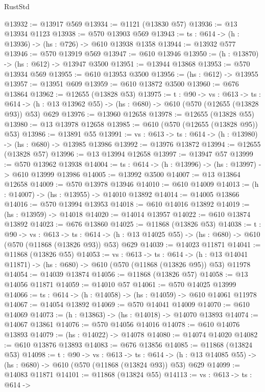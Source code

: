 \begin{lexlean}{RustStd}
\begin{coremodule}
@13932 := @13917 @569
@13934 := @1121 (@13830 @57)
@13936 := @13 @13934 @1123
@13938 := @570 @13903 @569
@13943 := {ts : @614} -> (h : @13936) -> (hs : @726) -> @610 @13938 @1358
@13944 := @13932 @577
@13946 := @570 @13919 @569
@13947 := @610 @13946
@13950 := (h : @13870) -> (hs : @612) -> @13947 @3500
@13951 := @13944 @13868
@13953 := @570 @13934 @569
@13955 := @610 @13953 @3500
@13956 := (hs : @612) -> @13955
@13957 := @13951 @609
@13959 := @610 @13872 @3500
@13960 := @676 @13864
@13962 := @12655 (@13828 @53)
@13975 := {t : @90} ->
  {vs : @613} ->
  {ts : @614} -> (h : @13 @13962 @55) -> (hs : @680) -> @610 (@570 (@12655 (@13828 @93)) @53) @629
@13976 := @13960 @12658
@13978 := @12655 (@13828 @55)
@13980 := @13 @13978 @12658
@13985 := @610 (@570 (@12655 (@13828 @95)) @53)
@13986 := @13891 @55
@13991 := {vs : @613} -> {ts : @614} -> (h : @13980) -> (hs : @680) -> @13985 @13986
@13992 := @13976 @13872
@13994 := @12655 (@13828 @57)
@13996 := @13 @13994 @12658
@13997 := @13947 @57
@13999 := @570 @13962 @13938
@14004 := {ts : @614} -> (h : @13996) -> (hs : @13997) -> @610 @13999 @13986
@14005 := @13992 @3500
@14007 := @13 @13864 @12658
@14009 := @570 @13978 @13946
@14010 := @610 @14009
@14013 := (h : @14007) -> (hs : @13955) -> @14010 @13892
@14014 := @14005 @13866
@14016 := @570 @13994 @13953
@14018 := @610 @14016 @13892
@14019 := (hs : @13959) -> @14018
@14020 := @14014 @13957
@14022 := @610 @13874 @13892
@14023 := @676 @13860
@14025 := @11868 (@13826 @53)
@14038 := {t : @90} ->
  {vs : @613} ->
  {ts : @614} -> (h : @13 @14025 @55) -> (hs : @680) -> @610 (@570 (@11868 (@13826 @93)) @53) @629
@14039 := @14023 @11871
@14041 := @11868 (@13826 @55)
@14053 := {vs : @613} ->
  {ts : @614} ->
  (h : @13 @14041 @11871) -> (hs : @680) -> @610 (@570 (@11868 (@13826 @95)) @53) @11978
@14054 := @14039 @13874
@14056 := @11868 (@13826 @57)
@14058 := @13 @14056 @11871
@14059 := @14010 @57
@14061 := @570 @14025 @13999
@14066 := {ts : @614} -> (h : @14058) -> (hs : @14059) -> @610 @14061 @11978
@14067 := @14054 @13892
@14069 := @570 @14041 @14009
@14070 := @610 @14069
@14073 := (h : @13863) -> (hs : @14018) -> @14070 @13893
@14074 := @14067 @13861
@14076 := @570 @14056 @14016
@14078 := @610 @14076 @13893
@14079 := (hs : @14022) -> @14078
@14080 := @14074 @14020
@14082 := @610 @13876 @13893
@14083 := @676 @13856
@14085 := @11868 (@13824 @53)
@14098 := {t : @90} ->
  {vs : @613} ->
  {ts : @614} -> (h : @13 @14085 @55) -> (hs : @680) -> @610 (@570 (@11868 (@13824 @93)) @53) @629
@14099 := @14083 @11871
@14101 := @11868 (@13824 @55)
@14113 := {vs : @613} ->
  {ts : @614} ->

\end{coremodule}
\end{lexlean}

